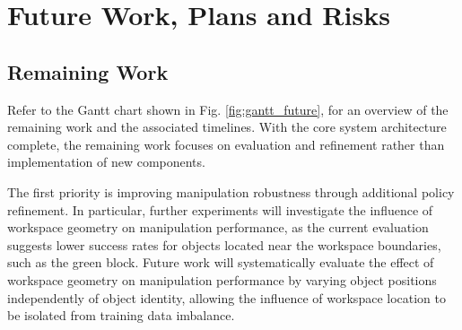 \documentclass[conference, 12pt]{IEEEtran}
\begin{document}





\section{Future Work, Plans and Risks}

\subsection{Remaining Work}
Refer to the Gantt chart shown in Fig. \ref{fig:gantt_future}, for an overview of the remaining work and the associated timelines.
With the core system architecture complete, the remaining work focuses on evaluation and refinement rather than implementation of new components.

The first priority is improving manipulation robustness through additional policy refinement. In particular, further experiments will investigate the influence of workspace geometry on manipulation performance, as the current evaluation suggests lower success rates for objects located near the workspace boundaries, such as the green block. Future work will systematically evaluate the effect of workspace geometry on manipulation performance by varying object positions independently of object identity, allowing the influence of workspace location to be isolated from training data imbalance.
\end{document}
